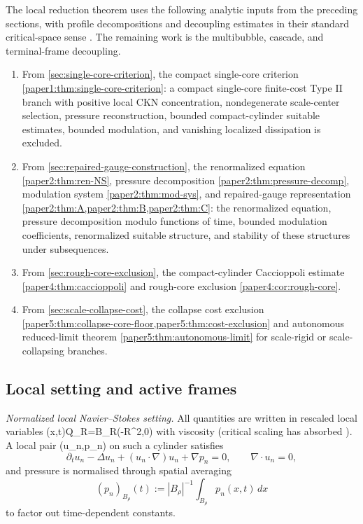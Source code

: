 \documentclass[11pt]{amsart}
\def\({}%
\def\){}%
\theoremstyle{plain}
\theoremstyle{definition}
\theoremstyle{remark}
\begin{document}
The local reduction theorem uses the following analytic inputs from the
preceding sections, with profile decompositions and decoupling estimates in
their standard critical-space sense \cite{Gallagher2001,BrezisLieb1983}.  The
remaining work is the multibubble, cascade, and terminal-frame decoupling.
\begin{enumerate}[label=\textup{(\roman*)}]
\item From \cref{sec:single-core-criterion}, the compact single-core criterion \cref{paper1:thm:single-core-criterion}: a
compact single-core finite-cost Type II branch with positive local CKN
concentration, nondegenerate scale-center selection, pressure reconstruction,
bounded compact-cylinder suitable estimates, bounded modulation, and vanishing
localized dissipation is excluded.
\item From \cref{sec:repaired-gauge-construction}, the renormalized equation \cref{paper2:thm:ren-NS}, pressure decomposition \cref{paper2:thm:pressure-decomp}, modulation system \cref{paper2:thm:mod-sys}, and repaired-gauge representation \cref{paper2:thm:A,paper2:thm:B,paper2:thm:C}: the renormalized equation,
pressure decomposition modulo functions of time, bounded modulation
coefficients, renormalized suitable structure, and stability of these structures
under subsequences.
\item From \cref{sec:rough-core-exclusion}, the compact-cylinder Caccioppoli estimate \cref{paper4:thm:caccioppoli} and rough-core exclusion \cref{paper4:cor:rough-core}.
\item From \cref{sec:scale-collapse-cost}, the collapse cost exclusion \cref{paper5:thm:collapse-core-floor,paper5:thm:cost-exclusion} and autonomous reduced-limit theorem \cref{paper5:thm:autonomous-limit} for scale-rigid or scale-collapsing branches.
\end{enumerate}

\subsection{Local setting and active frames}

\medskip
\noindent\textit{Normalized local Navier--Stokes setting.}
All quantities are written in rescaled local variables \((x,t)\in Q_R=B_R\times(-R^2,0)\)
with viscosity \(\) (critical scaling has absorbed \(\nu\)).  A local pair
\((u_n,p_n)\) on such a cylinder satisfies
\[
  \partial_tu_n-\Delta u_n+(u_n\cdot\nabla)u_n+\nabla p_n=0,\qquad \nabla\cdot u_n=0,
\]
and pressure is normalised through spatial averaging
\[
  (p_n)_{B_\rho}(t):=|B_\rho|^{-1}\int_{B_\rho}p_n(x,t)\,dx
\]
to factor out time-dependent constants.
\end{document}
